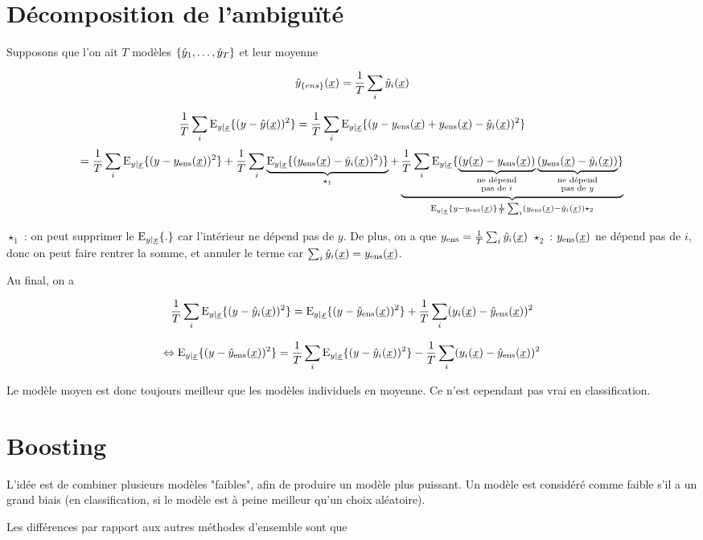 	
\section{Décomposition de l'ambiguïté}

Supposons que l'on ait $T$ modèles $\ens{\yh_1, \dots , \yh_T}$ et leur moyenne

$$\yh_{\ens{ens}}(\xu) = \frac{1}{T} \sum_i \yh_i(\xu)$$


$$\frac{1}{T} \sum_i \eyx{(y - \yh(\xu))^2} = \frac{1}{T} \sum_i \eyx{(y - \yens(\xu) + \yens(\xu) - \yh_i(\xu))^2}$$
$$= 
\frac{1}{T} \sum_i \eyx{(y - \yens(\xu))^2} 
+ \frac{1}{T} \sum_i \underbrace{\eyx{(\yens(\xu) - \yh_i(\xu))^2)}}_{\star_1}
+ \underbrace{\frac{1}{T} \sum_i \eyx{\underbrace{(y(\xu) - \yens(\xu))}_{\substack{\text{ne dépend} \\ \text{pas de }i}}
\underbrace{(\yens(\xu) - \yh_i(\xu))}_{\substack{\text{ne dépend} \\
 \text{pas de } y}}}}_{\eyx{y - \yens(\xu)}\frac{1}{T} \sum_i (\yens(\xu) - \yh_i(\xu)) \star_2}$$
 
 $\star_1$ : on peut supprimer le $\eyx{.}$ car l'intérieur ne dépend pas de $y$. De plus, on a que $\yens = \frac{1}{T} \sum_i \yh_i(\xu)$
 $\star_2$ : $\yens(\xu)$ ne dépend pas de $i$, donc on peut faire rentrer la somme, et annuler le terme car $\sum_i \yh_i(\xu) = \yens(\xu)$.
 
 Au final, on a

$$\frac{1}{T}\sum_i \eyx{(y - \yh_i(\xu))^2} = \eyx{(y - \yhens(\xu))^2} + \frac{1}{T} \sum_i (y_i(\xu) - \yhens(\xu))^2$$

$$\Leftrightarrow \eyx{(y - \yhens(\xu))^2} = \frac{1}{T}\sum_i \eyx{(y - \yh_i(\xu))^2} - \frac{1}{T} \sum_i (y_i(\xu) - \yhens(\xu))^2$$

Le modèle moyen est donc toujours meilleur que les modèles individuels en moyenne. Ce n'est cependant pas vrai en classification.
	
\section{Boosting}
	
L'idée est de combiner plusieurs modèles "faibles", afin de produire un modèle plus puissant. Un modèle est considéré comme faible s'il a un grand biais (en classification, si le modèle est à peine meilleur qu'un choix aléatoire).

Les différences par rapport aux autres méthodes d'ensemble sont que

